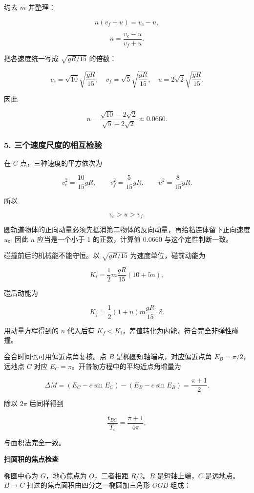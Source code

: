 \documentclass[12pt,a4paper,UTF8]{ctexart}
\begin{document}
约去 \(m\) 并整理：

\[
n(v_f+u)=v_c-u,
\]

\[
n=\frac{v_c-u}{v_f+u}.
\]

把各速度统一写成 \(\sqrt{gR/15}\) 的倍数：

\[
v_c=\sqrt{10}\sqrt{\frac{gR}{15}},
\quad
v_f=\sqrt5\sqrt{\frac{gR}{15}},
\quad
u=2\sqrt2\sqrt{\frac{gR}{15}}.
\]

因此

\[
\boxed{
n=\frac{\sqrt{10}-2\sqrt2}{\sqrt5+2\sqrt2}
\approx0.0660
}.
\]

\subsubsection{5.
三个速度尺度的相互检验}\label{ux4e09ux4e2aux901fux5ea6ux5c3aux5ea6ux7684ux76f8ux4e92ux68c0ux9a8c}

在 \(C\) 点，三种速度的平方依次为

\[
v_c^2=\frac{10}{15}gR,
\qquad
v_f^2=\frac{5}{15}gR,
\qquad
u^2=\frac{8}{15}gR.
\]

所以

\[
v_c>u>v_f.
\]

圆轨道物体的正向动量必须先抵消第二物体的反向动量，再给粘连体留下正向速度
\(u\)。因此 \(n\) 应当是一个小于 \(1\) 的正数，计算值 \(0.0660\)
与这个定性判断一致。

碰撞前后的机械能不能守恒。以 \(\sqrt{gR/15}\) 为速度单位，碰前动能为

\[
K_i=\frac12m\frac{gR}{15}(10+5n),
\]

碰后动能为

\[
K_f=\frac12(1+n)m\frac{gR}{15}\cdot8.
\]

用动量方程得到的 \(n\) 代入后有
\(K_f<K_i\)，差值转化为内能，符合完全非弹性碰撞。

会合时间也可用偏近点角复核。点 \(B\) 是椭圆短轴端点，对应偏近点角
\(E_B=\pi/2\)，远地点 \(C\) 对应
\(E_C=\pi\)。开普勒方程中的平均近点角增量为

\[
\Delta M=(E_C-e\sin E_C)-(E_B-e\sin E_B)
=\frac{\pi+1}{2}.
\]

除以 \(2\pi\) 后同样得到

\[
\frac{t_{BC}}{T_e}=\frac{\pi+1}{4\pi},
\]

与面积法完全一致。

\textbf{扫面积的焦点检查}

椭圆中心为 \(G\)，地心焦点为 \(O\)，二者相距 \(R/2\)。\(B\)
是短轴上端，\(C\) 是远地点。\(B\to C\)
扫过的焦点面积由四分之一椭圆加三角形 \(OGB\) 组成：
\end{document}

